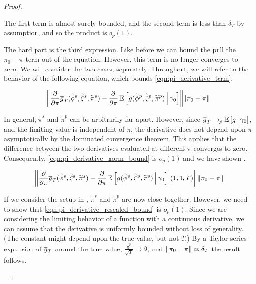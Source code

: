 \documentclass[11pt, letterpaper, twoside, final]{article}
\begin{document}
\begin{appendices}
\begin{proof}
\begin{proofpart}
    The first term is almost surely bounded, and the second term is less than $\delta_T$ by assumption, and so the
    product is $o_p(1)$.

    The hard part is the third expression.
    Like before we can bound the pull the $\pi_0 - \pi$ term out of the equation.
    However, this term is no longer converges to zero.
    We will consider the two cases, separately.
    Throughout, we will refer to the behavior of the following equation, which bounds
    \cref{eqn:pi_derivative_term}.


    \begin{equation}
        \norm*{\frac{\partial}{\partial \pi}\sampmom(\widetilde{\phi}^s, \widetilde{\zeta}^s, \widetilde{\pi}^s) -
        \frac{\partial}{\partial \pi} \E\left[\popmom(\widetilde{\phi}^p, \widetilde{\zeta}^p,
        \widetilde{\pi}^p)\mvert \gamma_0\right] } \norm*{\pi_0 - \pi} 
        \label{eqn:pi_derivative_norm_bound}
    \end{equation}

    In general, $\tilde{\pi}^s$ and $\tilde{\pi}^p$ can be arbitrarily far apart.
    However, since $\overline{g}_T \to_p \operatorname{\mathbb{E}}\left[g \,\middle\vert\, \gamma_0\right]$, and the limiting value is independent of
    $\pi$, the derivative does not depend upon $\pi$ asymptotically by the dominated convergence theorem.
    This applies that the difference between the two derivatives evaluated at different $\pi$ converges to zero.
    Consequently, \cref{eqn:pi_derivative_norm_bound} is $o_p(1)$ and we have shown .

    \begin{equation}
        \norm*{\abs*{\frac{\partial}{\partial \pi}\sampmom(\widetilde{\phi}^s, \widetilde{\zeta}^s,
        \widetilde{\pi}^s) - \frac{\partial}{\partial \pi} \E\left[\popmom(\widetilde{\phi}^p,
        \widetilde{\zeta}^p, \widetilde{\pi}^p)\mvert \gamma_0\right]} (1, 1, T)} \norm*{\pi_0 - \pi} 
        \label{eqn:pi_derivative_rescaled_bound}
    \end{equation}

    If we consider the setup in , $\tilde{\pi}^s$ and $\tilde{\pi}^p$ are now close together.
    However, we need to show that \cref{eqn:pi_derivative_rescaled_bound} is $o_p(1)$.
    Since we are considering the limiting behavior of a function with a continuous derivative, we can assume that
    the derivative is uniformly bounded without loss of generality. 
    (The constant might depend upon the true value, but not $T$.)
    By a Taylor series expansion of $\overline{g}_T$ around the true value, $\frac{\widetilde{\pi}^p}{\sqrt{T}} \to 0$,
    and $\lVert\pi_0 - \pi\rVert \propto \delta_T$ the result follows.


\end{proofpart}
\end{proof}
\end{appendices}
\end{document}

